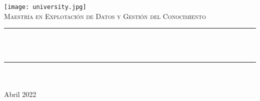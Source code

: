 \begin{titlepage}

    \newcommand{\HRule}{\rule{\linewidth}{0.5mm}}

    \center
    \texttt{[image: university.jpg]}\\[1cm]

    \textsc{\Large Maestr\'ia en Explotaci\'on de Datos y Gesti\'on del Conocimiento}\\[1.5cm]

    \makeatletter
    \HRule \\[0.6cm]
    {\huge \bfseries \@title}\\[0.4cm]
    \HRule \\[2cm]

    {\Large \@author}\\[3cm]

    {\large Abril 2022}\\[2cm]

    \vfill
\end{titlepage}